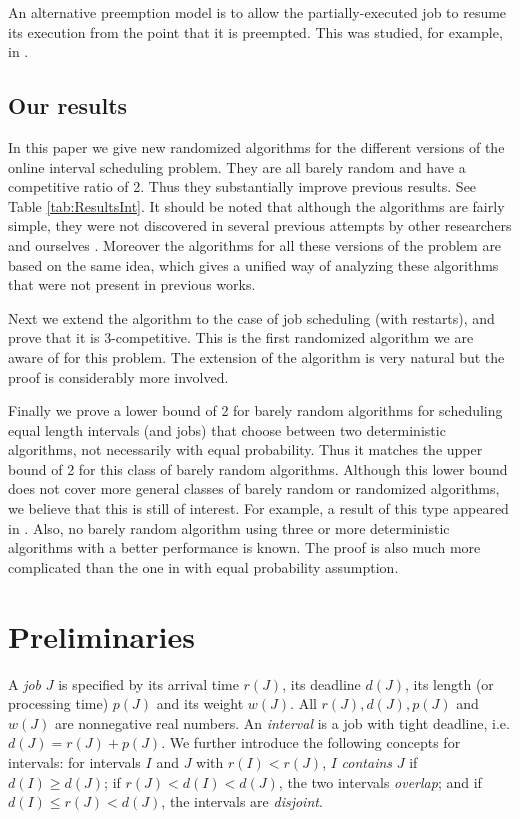 \documentclass[11pt]{article}
\begin{document}
An alternative preemption model is to allow the partially-executed job to
resume its execution from the point that it is preempted.  This was
studied, for example, in \cite{BKMMR+92,KorSha95}.

\subsection{Our results}

In this paper we give new randomized algorithms for the different
versions of the online interval scheduling problem.
They are all barely random and have a competitive ratio of 2.
Thus they substantially improve previous results. 
See Table \ref{tab:ResultsInt}.
It should be noted that although the algorithms are fairly
simple, they were not discovered in 
several previous attempts by other researchers and ourselves
\cite{EpsLev10,FuPoZh07,MiyErl04}.
Moreover the algorithms for all these versions of the problem are based on 
the same idea, which gives a unified way of analyzing these algorithms 
that were not present in previous works.

Next we extend the algorithm to the case of job scheduling (with restarts),
and prove that it is 3-competitive.
This is the first randomized algorithm we are aware of for this problem.
The extension of the algorithm is very natural but the proof is
considerably more involved.

Finally we prove a lower bound of 2 for barely random algorithms for 
scheduling equal length intervals (and jobs)
that choose between two deterministic algorithms, not necessarily with
equal probability.  Thus it matches the upper bound of 2 for this
class of barely random algorithms.
Although this lower bound does not cover more general classes of
barely random or randomized algorithms, we believe that this is still
of interest.
For example, a result of this type appeared in \cite{CJST07}.
Also, no barely random algorithm using three or more deterministic
algorithms with a better performance is known.
The proof is also much more complicated than the
one in \cite{FuPoZh07} with equal probability assumption.

\section{Preliminaries}

A {\it job} $J$ is specified by its arrival time $r(J)$, its deadline $d(J)$, 
its length (or processing time) $p(J)$ and its weight $w(J)$.  
All $r(J), d(J), p(J)$ and $w(J)$ are nonnegative real numbers.
An {\it interval} is a job with tight deadline, i.e. $d(J) = r(J) + p(J)$.
We further introduce the following concepts for intervals: for intervals $I$
and $J$ with $r(I) < r(J)$, $I$ \textit{contains} $J$ if
$d(I) \geq d(J)$; if $r(J) < d (I) < d(J)$, the two
intervals \textit{overlap}; and if $d(I) \le r(J) < d(J)$, the intervals
are {\it disjoint}.
\end{document}

